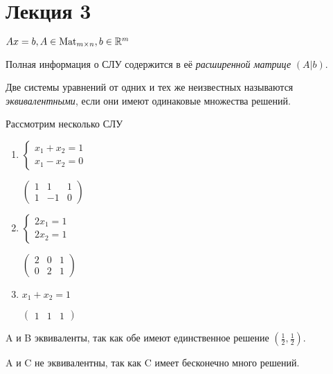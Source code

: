 \section{Лекция 3}

$Ax = b, A \in \text{Mat}_{m \times n}, b \in \mathbb{R}^m$

Полная информация о СЛУ содержится в её \textit{расширенной матрице} $(A | b)$.

\begin{definition}
    Две системы уравнений от одних и тех же неизвестных называются \textit{эквивалентными}, если они имеют одинаковые множества решений.
\end{definition}

\begin{example}
    Рассмотрим несколько СЛУ

    \begin{enumerate}[label=\Alph*)]
    \item
        $\begin{cases}
            x_1 + x_2 = 1 \\
            x_1 - x_2 = 0
        \end{cases}$

        $\begin{pmatrix}
            1 & 1 & 1 \\
            1 & -1 & 0
        \end{pmatrix}$

    \item
        $\begin{cases}
            2x_1 = 1 \\
            2x_2 = 1
        \end{cases}$

        $\begin{pmatrix}
            2 & 0 & 1 \\
            0 & 2 & 1
        \end{pmatrix}$

    \item
        $x_1 + x_2 = 1$
        
        $\begin{pmatrix} 1 & 1 & 1 \end{pmatrix}$
    \end{enumerate}

    A и B эквиваленты, так как обе имеют единственное решение $(\frac{1}{2}, \frac{1}{2})$.
    
    A и C не эквивалентны, так как C имеет бесконечно много решений.
\end{example}

